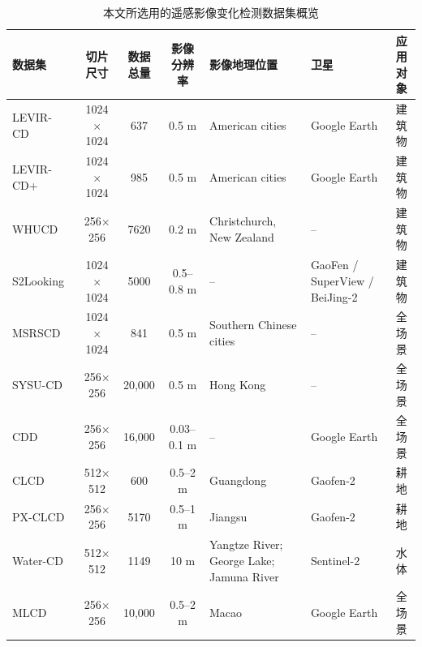 \begin{table}[!htb]
\centering
\caption{本文所选用的遥感影像变化检测数据集概览}
\label{tab:change_detection_datasets_review}
\setlength{\tabcolsep}{4pt} %
\renewcommand{\arraystretch}{1.15}
\small
\begin{tabularx}{\textwidth}{@{} l c c c X X c @{}}
\toprule
\textbf{数据集} & \textbf{切片尺寸} & \textbf{数据总量} & \textbf{影像分辨率} & \textbf{影像地理位置} & \textbf{卫星} & \textbf{应用对象} \\
\midrule
LEVIR-CD~\cite{chen_spatial-temporal_2020}   & 1024$\times$1024 & 637    & 0.5 m        & American cities                                   & Google Earth                     & 建筑物 \\
LEVIR-CD+~\cite{chen_spatial-temporal_2020}  & 1024$\times$1024 & 985    & 0.5 m        & American cities                                   & Google Earth                     & 建筑物 \\
WHUCD~\cite{Ji2019FullyCN}     & 256$\times$256   & 7620   & 0.2 m        & Christchurch, New Zealand                          & --                                & 建筑物 \\
S2Looking~\cite{Shen2021S2LookingAS}  & 1024$\times$1024 & 5000   & 0.5--0.8 m   & --                                                & GaoFen / SuperView / BeiJing-2   & 建筑物 \\
MSRSCD~\cite{Liu2025NetworkAD}     & 1024$\times$1024 & 841    & 0.5 m        & Southern Chinese cities                           & --                                & 全场景 \\
SYSU-CD~\cite{shi_deeply_2022}    & 256$\times$256   & 20{,}000 & 0.5 m       & Hong Kong                                         & --                                & 全场景 \\
CDD~\cite{Lebedev2018CHANGEDI}        & 256$\times$256   & 16{,}000 & 0.03--0.1 m & --                                                & Google Earth                     & 全场景 \\
CLCD~\cite{Liu2022ACN}       & 512$\times$512   & 600    & 0.5--2 m     & Guangdong                                         & Gaofen-2                         & 耕地 \\
PX-CLCD~\cite{miao_snunet3_2024}    & 256$\times$256   & 5170   & 0.5--1 m     & Jiangsu                                           & Gaofen-2                         & 耕地 \\
Water-CD~\cite{j_li_trsanet_2024}   & 512$\times$512   & 1149   & 10 m         & Yangtze River; George Lake; Jamuna River          & Sentinel-2                       & 水体 \\
MLCD~\cite{Huang2025SAMBasedEF}       & 256$\times$256   & 10{,}000 & 0.5--2 m    & Macao                                             & Google Earth                     & 全场景 \\
\bottomrule
\end{tabularx}
\end{table}


